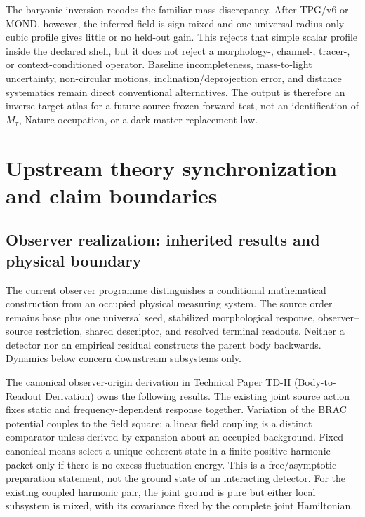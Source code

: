 \documentclass[11pt]{article}
\begin{document}
The baryonic inversion recodes the familiar mass discrepancy.  After TPG/v6
or MOND, however, the inferred field is sign-mixed and one universal
radius-only cubic profile gives little or no held-out gain.  This rejects that
simple scalar profile inside the declared shell, but it does not reject a
morphology-, channel-, tracer-, or context-conditioned operator.  Baseline
incompleteness, mass-to-light uncertainty, non-circular motions,
inclination/deprojection error, and distance systematics remain direct
conventional alternatives.  The output is therefore an inverse target atlas
for a future source-frozen forward test, not an identification of
$M_\tau$, Nature occupation, or a dark-matter replacement law.

\section{Upstream theory synchronization and claim boundaries}
\label{sec:observer-update-20260914}

\subsection{Observer realization: inherited results and physical boundary}
The current observer programme distinguishes a conditional mathematical
construction from an occupied physical measuring system. The source order
remains base plus one universal seed, stabilized morphological response,
observer--source restriction, shared descriptor, and resolved terminal
readouts. Neither a detector nor an empirical residual constructs the parent
body backwards. Dynamics below concern downstream subsystems only.

The canonical observer-origin derivation in Technical Paper TD-II
(Body-to-Readout Derivation) owns the following
results. The existing joint source action fixes static and frequency-dependent
response together. Variation of the BRAC potential couples to the field
square; a linear field coupling is a distinct comparator unless derived by
expansion about an occupied background. Fixed canonical means select a unique
coherent state in a finite positive harmonic packet only if there is no excess
fluctuation energy. This is a free/asymptotic preparation statement, not the
ground state of an interacting detector. For the existing coupled harmonic
pair, the joint ground is pure but either local subsystem is mixed, with its
covariance fixed by the complete joint Hamiltonian.
\end{document}

